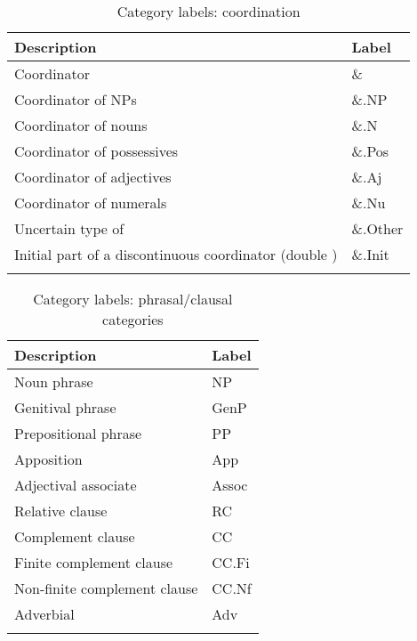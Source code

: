 \documentclass[output=paper,colorlinks,citecolor=brown]{langscibook}
\begin{document}
\begin{table}
 \caption{Category labels: coordination}
 \begin{tabularx}{\textwidth}{Ql}\lsptoprule
   Description & Label \\\midrule
   Coordinator & {\&} \\
   \quad Coordinator of NPs & {\&.NP} \\  
   \quad Coordinator of nouns & {\&.N } \\  
   \quad Coordinator of possessives & {\&.Pos} \\  
   \quad Coordinator of adjectives & {\&.Aj} \\  
   \quad Coordinator of numerals & {\&.Nu} \\  
   \quad Uncertain type of  & {\&.Other} \\
   \quad Initial part of a discontinuous coordinator (double ) & {\&.Init } \\
   \lspbottomrule
 \end{tabularx}
\label{tab:coord}
\end{table}


\begin{table}
  \caption{Category labels: phrasal/clausal categories}
  \begin{tabularx}{\textwidth}{Xl}\lsptoprule
    Description & Label \\\midrule
    Noun phrase & {NP} \\
    Genitival phrase & {GenP} \\ 
    Prepositional phrase & {PP} \\ 
    Apposition & {App} \\ 
    Adjectival associate & {Assoc} \\
    Relative clause & {RC} \\ 
    Complement clause & {CC} \\ 
    \quad Finite complement clause & {CC.Fi} \\  
    \quad Non-finite complement clause & {CC.Nf} \\  
    Adverbial & {Adv} \\
    \lspbottomrule
  \end{tabularx}
\end{table}
 
\end{document}
